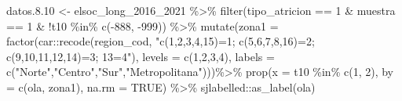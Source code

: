 \documentclass[
  12pt,
]{book}
\newenvironment{Shaded}{\begin{snugshade}}{\end{snugshade}}
\newcommand{\AttributeTok}[1]{\textcolor[rgb]{0.77,0.63,0.00}{#1}}
\newcommand{\ConstantTok}[1]{\textcolor[rgb]{0.00,0.00,0.00}{#1}}
\newcommand{\DecValTok}[1]{\textcolor[rgb]{0.00,0.00,0.81}{#1}}
\newcommand{\FloatTok}[1]{\textcolor[rgb]{0.00,0.00,0.81}{#1}}
\newcommand{\FunctionTok}[1]{\textcolor[rgb]{0.00,0.00,0.00}{#1}}
\newcommand{\NormalTok}[1]{#1}
\newcommand{\OtherTok}[1]{\textcolor[rgb]{0.56,0.35,0.01}{#1}}
\newcommand{\SpecialCharTok}[1]{\textcolor[rgb]{0.00,0.00,0.00}{#1}}
\newcommand{\StringTok}[1]{\textcolor[rgb]{0.31,0.60,0.02}{#1}}
\begin{document}
\begin{Shaded}
\begin{Highlighting}[]
\NormalTok{datos.}\FloatTok{8.10} \OtherTok{\textless{}{-}}\NormalTok{ elsoc\_long\_2016\_2021 }\SpecialCharTok{\%\textgreater{}\%} 
  \FunctionTok{filter}\NormalTok{(tipo\_atricion }\SpecialCharTok{==} \DecValTok{1} \SpecialCharTok{\&}\NormalTok{ muestra }\SpecialCharTok{==} \DecValTok{1} \SpecialCharTok{\&} \SpecialCharTok{!}\NormalTok{t10 }\SpecialCharTok{\%in\%} \FunctionTok{c}\NormalTok{(}\SpecialCharTok{{-}}\DecValTok{888}\NormalTok{, }\SpecialCharTok{{-}}\DecValTok{999}\NormalTok{)) }\SpecialCharTok{\%\textgreater{}\%} 
  \FunctionTok{mutate}\NormalTok{(}\AttributeTok{zona1 =} \FunctionTok{factor}\NormalTok{(car}\SpecialCharTok{::}\FunctionTok{recode}\NormalTok{(region\_cod, }
                                    \StringTok{"c(1,2,3,4,15)=1; c(5,6,7,8,16)=2; c(9,10,11,12,14)=3; 13=4"}\NormalTok{),}
                        \AttributeTok{levels =} \FunctionTok{c}\NormalTok{(}\DecValTok{1}\NormalTok{,}\DecValTok{2}\NormalTok{,}\DecValTok{3}\NormalTok{,}\DecValTok{4}\NormalTok{), }
                        \AttributeTok{labels =} \FunctionTok{c}\NormalTok{(}\StringTok{"Norte"}\NormalTok{,}\StringTok{"Centro"}\NormalTok{,}\StringTok{"Sur"}\NormalTok{,}\StringTok{"Metropolitana"}\NormalTok{)))}\SpecialCharTok{\%\textgreater{}\%}
  \FunctionTok{prop}\NormalTok{(}\AttributeTok{x =}\NormalTok{ t10 }\SpecialCharTok{\%in\%} \FunctionTok{c}\NormalTok{(}\DecValTok{1}\NormalTok{, }\DecValTok{2}\NormalTok{), }\AttributeTok{by =} \FunctionTok{c}\NormalTok{(ola, zona1), }\AttributeTok{na.rm =} \ConstantTok{TRUE}\NormalTok{) }\SpecialCharTok{\%\textgreater{}\%} 
\NormalTok{  sjlabelled}\SpecialCharTok{::}\FunctionTok{as\_label}\NormalTok{(ola)}


\end{Highlighting}
\end{Shaded}
\end{document}
